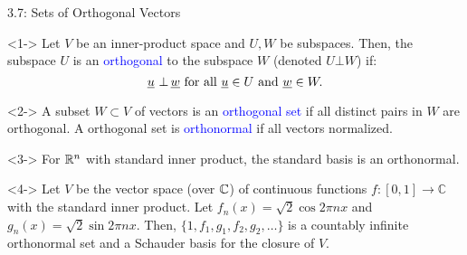\documentclass[10pt,english,aspectratio=169]{beamer}
\begin{document}
\begin{frame}{3.7: Sets of Orthogonal Vectors}

\vspace{-1mm}

\begin{definition}<1->
Let $V$ be an inner-product space and $U,W$ be subspaces.
Then, the subspace $U$ is an \textcolor{blue}{orthogonal} to the subspace $W$ (denoted $U \bot W$) if: \vspace{-2mm}
$$ \underline{u} \ \bot \, \underline{w} \text{  for all } \underline{u}\in U \text{ and } \underline{w}\in W. $$
\end{definition}

\vspace{-1mm}

\begin{definition}<2->
A subset $W\subset V$ of vectors is an \textcolor{blue}{orthogonal set} if all distinct pairs in $W$ are orthogonal.
A orthogonal set is \textcolor{blue}{orthonormal} if all vectors normalized.
\end{definition}

\vspace{-1mm}

\begin{example}<3->
For $\mathbb{R}^n$ with standard inner product, the standard basis is an orthonormal.
\end{example}

\vspace{-1mm}

\begin{example}<4->
Let $V$ be the vector space (over $\mathbb{C}$) of continuous functions $f\colon [0,1]\to\mathbb{C}$ with the standard inner product.
Let $f_n(x) = \sqrt{2} \cos 2 \pi n x$ and $g_n (x) = \sqrt{2} \sin 2 \pi n x$.
Then, $\{ 1, f_1, g_1, f_2, g_2, \ldots \}$ is a countably infinite orthonormal set and a Schauder basis for the closure of $V$.
\end{example}

\end{frame}
\end{document}
